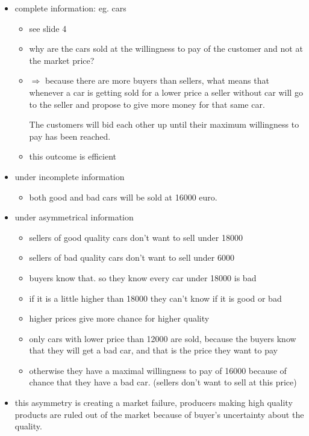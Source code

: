 \documentclass[12pt, a4paper, titlepage]{extarticle}
\begin{document}
    \begin{itemize}
    \item complete information: eg. cars
        \begin{itemize}
        \item see slide 4
        \item why are the cars sold at the willingness to pay of the customer and not at the market price?
        \item $\Rightarrow$ because there are more buyers than sellers, what means that whenever a car is getting sold for a lower price a seller without car will go to the seller and propose to give more money for that same car.
        
        The customers will bid each other up until their maximum willingness to pay has been reached.
        \item this outcome is efficient
        \end{itemize}
    \item under incomplete information
        \begin{itemize}
        \item both good and bad cars will be sold at 16000 euro.
        \end{itemize}
    \item under asymmetrical information
        \begin{itemize}
        \item sellers of good quality cars don't want to sell under 18000
        \item sellers of bad quality cars don't want to sell under 6000 
        \item buyers know that. so they know every car under 18000 is bad
        \item if it is a little higher than 18000 they can't know if it is good or bad
        \item higher prices give more chance for higher quality
        \item only cars with lower price than 12000 are sold, because the buyers know that they will get a bad car, and that is the price they want to pay
        \item otherwise they have a maximal willingness to pay of 16000 because of chance that they have a bad car. (sellers don't want to sell at this price)
        \end{itemize}
    \item this asymmetry is creating a market failure, producers making high quality products are ruled out of the market because of buyer's uncertainty about the quality. 

\end{itemize}
\end{document}
